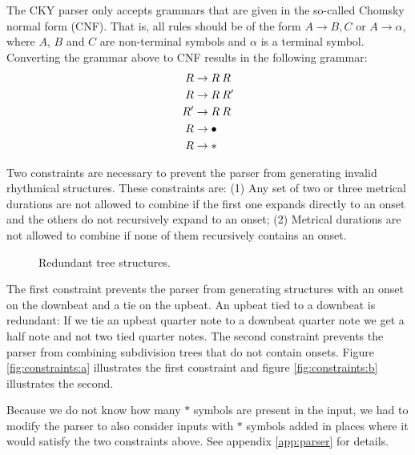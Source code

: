 The CKY parser only accepts grammars that are given in the so-called Chomsky normal form (CNF). That is, all rules should be of the form $A \rightarrow B, C$ or $A \rightarrow \alpha$, where $A$, $B$ and $C$ are non-terminal symbols and $\alpha$ is a terminal symbol. Converting the grammar above to CNF results in the following grammar:
\begin{align}
\label{eq:grammar_cnf}
R &\rightarrow R\: R\\ \notag
R &\rightarrow R\: R'\\ \notag
R' &\rightarrow R\: R\\ \notag
R &\rightarrow \bullet\\ \notag
R &\rightarrow * \notag
\end{align}

Two constraints are necessary to prevent the parser from generating invalid rhythmical structures. These constraints are: (1) Any set of two or three metrical durations are not allowed to combine if the first one expands directly to an onset and the others do not recursively expand to an onset; (2) Metrical durations are not allowed to combine if none of them recursively contains an onset.

\begin{figure}
\centering
{}
\qquad
{}
\caption{Redundant tree structures.}
\label{fig:constraints}
\end{figure}

The first constraint prevents the parser from generating structures with an onset on the downbeat and a tie on the upbeat. An upbeat tied to a downbeat is redundant: If we tie an upbeat quarter note to a downbeat quarter note we get a half note and not two tied quarter notes. The second constraint prevents the parser from combining subdivision trees that do not contain onsets. Figure \ref{fig:constraints:a} illustrates the first constraint and figure \ref{fig:constraints:b} illustrates the second.

Because we do not know how many $*$ symbols are present in the input, we had to modify the parser to also consider inputs with $*$ symbols added in places where it would satisfy the two constraints above. See appendix \ref{app:parser} for details.

